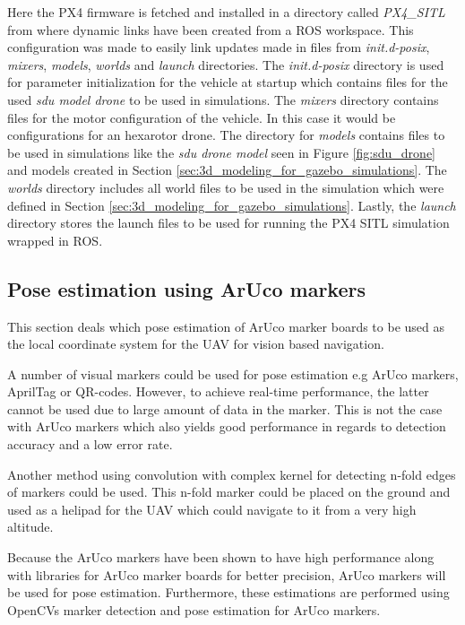 \documentclass[../Head/report.tex]{subfiles}
\begin{document}
Here the PX4 firmware is fetched and installed in a directory called \textit{PX4\_SITL} from where dynamic links have been created from a ROS workspace. This configuration was made to easily link updates made in files from \textit{init.d-posix}, \textit{mixers}, \textit{models}, \textit{worlds} and \textit{launch} directories. The \textit{init.d-posix} directory is used for parameter initialization for the vehicle at startup which contains files for the used \textit{sdu model drone} to be used in simulations. The \textit{mixers} directory contains files for the motor configuration of the vehicle. In this case it would be configurations for an hexarotor drone. The directory for \textit{models} contains files to be used in simulations like the \textit{sdu drone model} seen in Figure  \ref{fig:sdu_drone} and models created in Section \ref{sec:3d_modeling_for_gazebo_simulations}. The \textit{worlds} directory includes all world files to be used in the simulation which were defined in Section \ref{sec:3d_modeling_for_gazebo_simulations}. Lastly, the \textit{launch} directory stores the launch files to be used for running the PX4 SITL simulation wrapped in ROS.   

\subsection{Pose estimation using ArUco markers}
\label{sec:pose_estimation_using_aruco_markers}

This section deals which pose estimation of ArUco marker boards to be used as the local coordinate system for the UAV for vision based navigation. 

A number of visual markers could be used for pose estimation e.g ArUco markers, AprilTag or QR-codes. However, to achieve real-time performance, the latter cannot be used due to large amount of data in the marker. This is not the case with ArUco markers which also yields good performance in regards to detection accuracy and a low error rate. \cite{visualmarkers} 

Another method using convolution with complex kernel for detecting n-fold edges of markers could be used.\cite{nFoldMarkers} This n-fold marker could be placed on the ground and used as a helipad for the UAV which could navigate to it from a very high altitude.  

Because the ArUco markers have been shown to have high performance along with libraries for ArUco marker boards for better precision, ArUco markers will be used for pose estimation.\cite{visualmarkers} Furthermore, these estimations are performed using OpenCVs marker detection and pose estimation for ArUco markers.
\end{document}
